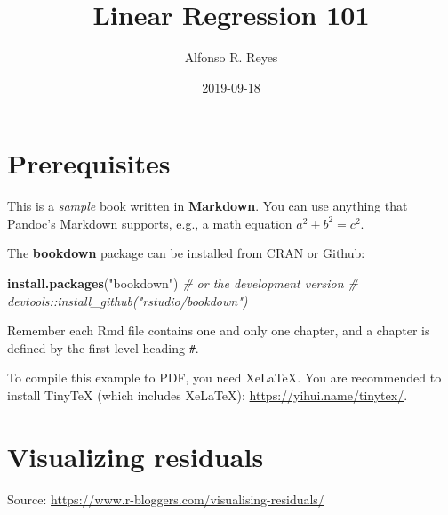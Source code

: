 \documentclass[]{book}
\title{Linear Regression 101}
\author{Alfonso R. Reyes}
\date{2019-09-18}
\newenvironment{Shaded}{\begin{snugshade}}{\end{snugshade}}
\newcommand{\CommentTok}[1]{\textcolor[rgb]{0.56,0.35,0.01}{\textit{#1}}}
\newcommand{\KeywordTok}[1]{\textcolor[rgb]{0.13,0.29,0.53}{\textbf{#1}}}
\newcommand{\NormalTok}[1]{#1}
\newcommand{\StringTok}[1]{\textcolor[rgb]{0.31,0.60,0.02}{#1}}
\begin{document}
\maketitle

{
\setcounter{tocdepth}{1}
\tableofcontents
}
\hypertarget{prerequisites}{%
\chapter*{Prerequisites}\label{prerequisites}}

This is a \emph{sample} book written in \textbf{Markdown}. You can use anything that Pandoc's Markdown supports, e.g., a math equation \(a^2 + b^2 = c^2\).

The \textbf{bookdown} package can be installed from CRAN or Github:

\begin{Shaded}
\begin{Highlighting}[]
\KeywordTok{install.packages}\NormalTok{(}\StringTok{"bookdown"}\NormalTok{)}
\CommentTok{# or the development version}
\CommentTok{# devtools::install_github("rstudio/bookdown")}
\end{Highlighting}
\end{Shaded}

Remember each Rmd file contains one and only one chapter, and a chapter is defined by the first-level heading \texttt{\#}.

To compile this example to PDF, you need XeLaTeX. You are recommended to install TinyTeX (which includes XeLaTeX): \url{https://yihui.name/tinytex/}.

\hypertarget{visualizing-residuals}{%
\chapter{Visualizing residuals}\label{visualizing-residuals}}

Source: \url{https://www.r-bloggers.com/visualising-residuals/}
\end{document}
